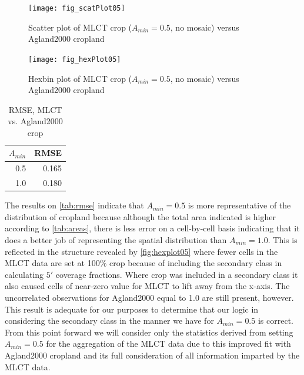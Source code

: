 \begin{figure}[hpt]
  \centering



\texttt{[image: fig\_scatPlot05]}
  \caption{Scatter plot of MLCT crop ($A_{min}=0.5$, no mosaic) versus Agland2000 cropland}
  \label{fig:scatplot05} 
\end{figure} 


\begin{figure}[hpt]
  \centering



\texttt{[image: fig\_hexPlot05]}
  \caption{Hexbin plot of MLCT crop ($A_{min}=0.5$, no mosaic) versus Agland2000 cropland}
  \label{fig:hexplot05} 
\end{figure} 

\begin{table}[ht]
\begin{center}
\begin{tabular}{rr}
  \hline
$A_{min}$ & RMSE \\ 
  \hline
0.5 & 0.165 \\ 
  1.0 & 0.180 \\ 
   \hline
\end{tabular}
\caption{RMSE, MLCT vs. Agland2000 crop}
\label{tab:rmse}
\end{center}
\end{table}

The results on \autoref{tab:rmse} indicate that $A_{min}=0.5$ is more
representative of the distribution of cropland because although the
total area indicated is higher according to \autoref{tab:areas}, there
is less error on a cell-by-cell basis indicating that it does a better
job of representing the spatial distribution than $A_{min}=1.0$.  This
is reflected in the structure revealed by \autoref{fig:hexplot05}
where fewer cells in the MLCT data are set at 100\% crop because of
including the secondary class in calculating $5'$ coverage fractions.
Where crop was included in a secondary class it also caused cells of
near-zero value for MLCT to lift away from the x-axis.  The
uncorrelated observations for Agland2000 equal to 1.0 are still
present, however.  This result is adequate for our purposes to
determine that our logic in considering the secondary class in the
manner we have for $A_{min}=0.5$ is correct.  From this point forward
we will consider only the statistics derived from setting
$A_{min}=0.5$ for the aggregation of the MLCT data due to this
improved fit with Agland2000 cropland and its full consideration of
all information imparted by the MLCT data.


